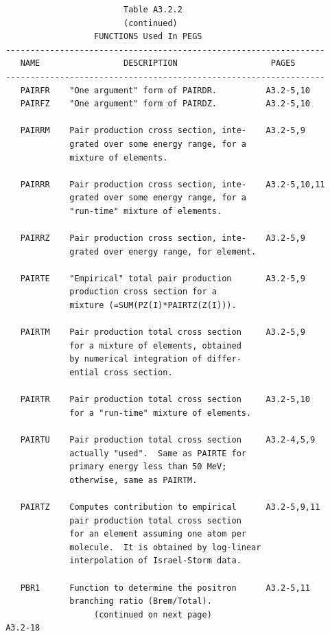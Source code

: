 \newpage {} \begin{verbatim}
                         Table A3.2.2
                         (continued)
                   FUNCTIONS Used In PEGS
 -----------------------------------------------------------------
    NAME                 DESCRIPTION                   PAGES
 -----------------------------------------------------------------
    PAIRFR    "One argument" form of PAIRDR.          A3.2-5,10
    PAIRFZ    "One argument" form of PAIRDZ.          A3.2-5,10

    PAIRRM    Pair production cross section, inte-    A3.2-5,9
              grated over some energy range, for a
              mixture of elements.

    PAIRRR    Pair production cross section, inte-    A3.2-5,10,11
              grated over some energy range, for a
              "run-time" mixture of elements.

    PAIRRZ    Pair production cross section, inte-    A3.2-5,9
              grated over energy range, for element.

    PAIRTE    "Empirical" total pair production       A3.2-5,9
              production cross section for a
              mixture (=SUM(PZ(I)*PAIRTZ(Z(I))).

    PAIRTM    Pair production total cross section     A3.2-5,9
              for a mixture of elements, obtained
              by numerical integration of differ-
              ential cross section.

    PAIRTR    Pair production total cross section     A3.2-5,10
              for a "run-time" mixture of elements.

    PAIRTU    Pair production total cross section     A3.2-4,5,9
              actually "used".  Same as PAIRTE for
              primary energy less than 50 MeV;
              otherwise, same as PAIRTM.

    PAIRTZ    Computes contribution to empirical      A3.2-5,9,11
              pair production total cross section
              for an element assuming one atom per
              molecule.  It is obtained by log-linear
              interpolation of Israel-Storm data.

    PBR1      Function to determine the positron      A3.2-5,11
              branching ratio (Brem/Total).
                   (continued on next page)
 A3.2-18
\end{verbatim}
